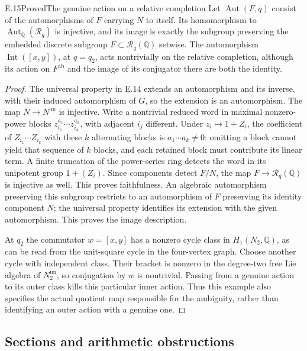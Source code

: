 \begin{statement}{E.15}{Proved}{The genuine action on a relative completion}
Let $\operatorname{Aut}(F,q)$ consist of the automorphisms of $F$
carrying $N$ to itself. Its homomorphism to
$\operatorname{Aut}_{\mathbb Q}(\mathcal R_q)$ is injective,
and its image is exactly the subgroup preserving the embedded
discrete subgroup $F\subset\mathcal R_q(\mathbb Q)$ setwise.
The automorphism $\operatorname{Int}([x,y])$, at $q=q_2$, acts
nontrivially on the relative completion, although its action
on $F^{\mathrm{ab}}$ and the image of its conjugator there are
both the identity.
\end{statement}
\begin{proof}
The universal property in E.14 extends an automorphism and its
inverse, with their induced automorphism of $G$, so the
extension is an automorphism. The map $N\to N^{\mathrm{un}}$
is injective. Write a nontrivial reduced word in maximal
nonzero-power blocks $z_{i_1}^{a_1}\cdots z_{i_k}^{a_k}$,
with adjacent $i_j$ different. Under $z_i\mapsto1+Z_i$,
the coefficient of $Z_{i_1}\cdots Z_{i_k}$ with these
$k$ alternating blocks is $a_1\cdots a_k\ne0$:
omitting a block cannot yield that sequence of $k$
blocks, and each retained block must contribute its
linear term. A finite truncation of the power-series
ring detects the word in its unipotent group $1+(Z_i)$.
Since
components detect $F/N$, the map $F\to\mathcal R_q(\mathbb Q)$
is injective as well. This proves faithfulness. An algebraic
automorphism preserving this subgroup restricts to an
automorphism of $F$ preserving its identity component $N$;
the universal property identifies its extension with the
given automorphism. This proves the image description.

At $q_2$ the commutator $w=[x,y]$ has a nonzero cycle class in
$H_1(N_2,\mathbb Q)$, as can be read from the unit-square
cycle in the four-vertex graph. Choose another cycle with
independent class. Their bracket is nonzero in the degree-two
free Lie algebra of $N_2^{\mathrm{un}}$, so conjugation by $w$
is nontrivial. Passing from a genuine action to its outer
class kills this particular inner action. Thus this example
also specifies the actual quotient map responsible for the
ambiguity, rather than identifying an outer action with a
genuine one.
\end{proof}

\subsection{Sections and arithmetic obstructions}

